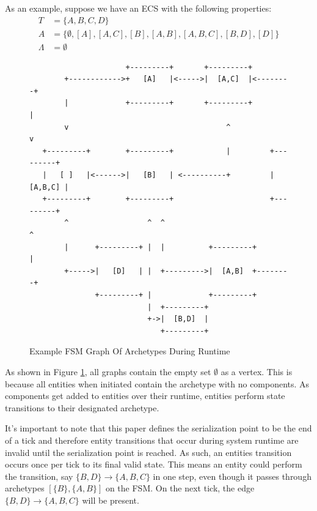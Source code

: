 As an example, suppose we have an ECS with the following properties:
\begin{align}
    T &= \{A,B,C,D\} \\
    A &= \{ \emptyset, [A] , [A,C] ,[B], [A,B], [A,B,C], [B,D], [D]\} \\
    \Lambda &= \emptyset
\end{align}
                                    
\begin{figure}[htbp]
    \centering
    \begin{verbatim}
                      +---------+       +---------+                                  
        +------------>+   [A]   |<----->|  [A,C]  |<--------+                        
        |             +---------+       +---------+         |                        
        v                                    ^              v                        
   +---------+        +---------+            |         +---------+                   
   |   [ ]   |<------>|   [B]   | <----------+         | [A,B,C] |                   
   +---------+        +---------+                      +---------+                   
        ^                  ^  ^                             ^                        
        |      +---------+ |  |          +---------+        |                        
        +----->|   [D]   | |  +--------->|  [A,B]  +--------+                        
               +---------+ |             +---------+                                 
                           |  +---------+                                            
                           +->|  [B,D]  |                                            
                              +---------+                                            
    \end{verbatim}
    \caption{Example FSM Graph Of Archetypes During Runtime}
    \label{fig:graph1}
\end{figure}

As shown in Figure \ref{fig:graph1}, all graphs contain the empty set $\emptyset$ as a vertex. This is because all entities when initiated contain the archetype with no components. As components get added to entities over their runtime, entities perform state transitions to their designated archetype.

It's important to note that this paper defines the serialization point to be the end of a tick and therefore entity transitions that occur during system runtime are invalid until the serialization point is reached. As such, an entities transition occurs once per tick to its final valid state. This means an entity could perform the transition, say $\{B,D\} \rightarrow \{A,B,C\}$ in one step, even though it passes through archetypes $[\{B\}, \{A,B\}]$ on the FSM. On the next tick, the edge $\{B,D\} \rightarrow \{A,B,C\}$ will be present. 

